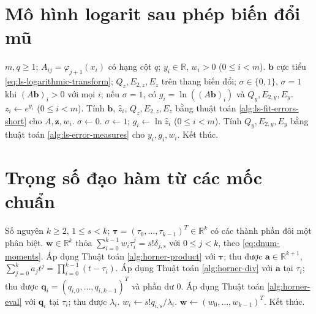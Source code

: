 \documentclass[12pt,a4paper,oneside]{book}
\numberwithin{algorithm}{chapter}
\theoremstyle{definition}
\newcommand{\R}{\mathbb{R}}
\begin{document}
\section{Mô hình logarit sau phép biến đổi mũ}
\begin{algorithm}[H]
\caption{Khớp $\ln(\sum_jb_j\varphi_j(x))$ và kiểm tra miền xác định}
\label{alg:ls-logarithmic-transform}
\begin{algorithmic}[1]
\Require $m,q\geq1$; $A_{ij}=\varphi_{j+1}(x_i)$ có hạng cột $q$; $y_i\in\R$, $w_i>0$ ($0\leq i<m$).
\Ensure $\boldsymbol b$ cực tiểu \eqref{eq:ls-logarithmic-transform}; $Q_z,E_{2,z},E_z$ trên thang biến đổi; $\sigma\in\{0,1\}$, $\sigma=1$ khi $(A\boldsymbol b)_i>0$ với mọi $i$; nếu $\sigma=1$, có $g_i=\ln((A\boldsymbol b)_i)$ và $Q_y,E_{2,y},E_y$.
\State $z_i\gets e^{y_i}$ ($0\leq i<m$).
\State Tính $\boldsymbol b$, $\widehat z_i$, $Q_z,E_{2,z},E_z$ bằng thuật toán \ref{alg:ls-fit-errors-short} cho $A,\boldsymbol z,w_i$.
\State $\sigma\gets0$.
 \State $\sigma\gets1$; $g_i\gets\ln\widehat z_i$ ($0\leq i<m$).
 \State Tính $Q_y,E_{2,y},E_y$ bằng thuật toán \ref{alg:ls-error-measures} cho $y_i,g_i,w_i$.
\EndIf
\Statex
\State Kết thúc.
\end{algorithmic}
\end{algorithm}


\section{Trọng số đạo hàm từ các mốc chuẩn}
\begin{algorithm}[H]
\caption{Dựng trọng số đạo hàm bằng Horner -- sơ lược}
\label{alg:dnum-weights}
\begin{algorithmic}[1]
\Require Số nguyên $k\geq2$, $1\leq s<k$; $\boldsymbol\tau=(\tau_0,\ldots,\tau_{k-1})^T\in\R^k$ có các thành phần đôi một phân biệt.
\Ensure $\boldsymbol w\in\R^k$ thỏa $\sum_{i=0}^{k-1}w_i\tau_i^j=s!\delta_{j,s}$ với $0\leq j<k$, theo \eqref{eq:dnum-moments}.
\State Áp dụng Thuật toán \ref{alg:horner-product} với $\boldsymbol\tau$; thu được $\boldsymbol a\in\R^{k+1}$, $\sum_{j=0}^ka_jt^j=\prod_{i=0}^{k-1}(t-\tau_i)$.
  \State Áp dụng Thuật toán \ref{alg:horner-div} với $\boldsymbol a$ tại $\tau_i$; thu được $\boldsymbol q_i=(q_{i,0},\ldots,q_{i,k-1})^T$ và phần dư $0$.
  \State Áp dụng Thuật toán \ref{alg:horner-eval} với $\boldsymbol q_i$ tại $\tau_i$; thu được $\lambda_i$.
  \State $w_i\gets s!q_{i,s}/\lambda_i$.
\EndFor
\Statex
\State $\boldsymbol w\gets(w_0,\ldots,w_{k-1})^T$.
\State Kết thúc.
\end{algorithmic}
\end{algorithm}
\end{document}
